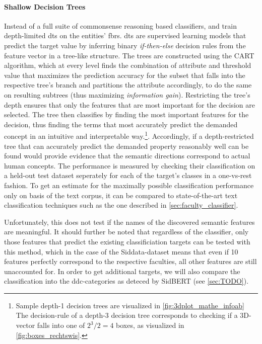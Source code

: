 \paragraph{Shallow Decision Trees} Instead of a full suite of commonsense reasoning based classifiers, \cite{Ager2018} and \cite{Alshaikh2020} train depth-limited \glspl{dt} \cite{breiman1984classification} on the entities' \glspl{fbr}. \Glspl{dt} are supervised learning models that predict the target value by inferring binary \textit{if-then-else} decision rules from the feature vector in a tree-like structure. The trees are constructed using the CART algorithm, which at every level finds the combination of attribute and threshold value that maximizes the prediction accuracy for the subset that falls into the respective tree's branch and partitions the attribute accordingly, to do the same on resulting subtrees (thus maximizing \emph{information gain}). %
Restricting the tree's depth ensures that only the features that are most important for the decision are selected. The tree then classifies by finding the most important features for the decision, thus finding the terms that most accurately predict the demanded concept in an intuitive and interpretable way.\footnote{Sample depth-1 decision trees are visualized in \autoref{fig:3dplot_mathe_infoab} The decision-rule of a depth-3 decision tree corresponds to checking if a 3D-vector falls into one of $2^3/2=4$ boxes, as visualized in \autoref{fig:boxes_rechtswis}.}. Accordingly, if a depth-restricted tree that can accurately predict the demanded property reasonably well can be found would provide evidence that the semantic directions correspond to actual human concepts. The performance is measured by checking their classification on a held-out test dataset seperately for each of the target's classes in a one-vs-rest fashion. To get an estimate for the maximally possible classification performance only on basis of the text corpus, it can be compared to state-of-the-art text classification techniques such as the one described in \autoref{sec:faculty_classifier}.

Unfortunately, this does not test if the names of the discovered semantic features are meaningful. It should further be noted that regardless of the classifier, only those features that predict the existing classificiation targets can be tested with this method, which in the case of the Siddata-dataset means that even if 10 features perfectly correspond to the respective faculties, all other features are still unaccounted for. In order to get additional targets, we will also compare the classification into the \gls{ddc}-categories as deteced by SidBERT (see \autoref{sec:TODO}).

